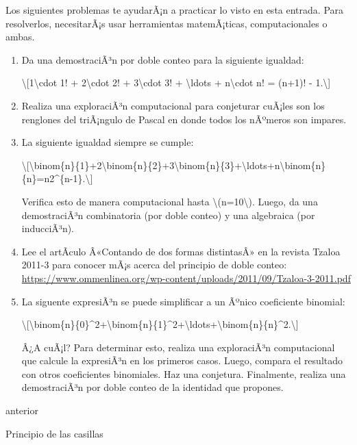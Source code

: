 \documentclass[
]{article}
\begin{document}
Los siguientes problemas te ayudarÃ¡n a practicar lo visto en esta
entrada. Para resolverlos, necesitarÃ¡s usar herramientas matemÃ¡ticas,
computacionales o ambas.

\begin{enumerate}
\item
  Da una demostraciÃ³n por doble conteo para la siguiente igualdad:

  \textbackslash{[}1\textbackslash cdot 1! + 2\textbackslash cdot 2! +
  3\textbackslash cdot 3! + \textbackslash ldots + n\textbackslash cdot
  n! = (n+1)! - 1.\textbackslash{]}
\item
  Realiza una exploraciÃ³n computacional para conjeturar cuÃ¡les son los
  renglones del triÃ¡ngulo de Pascal en donde todos los nÃºmeros son
  impares.
\item
  La siguiente igualdad siempre se cumple:

  \textbackslash{[}\textbackslash binom\{n\}\{1\}+2\textbackslash binom\{n\}\{2\}+3\textbackslash binom\{n\}\{3\}+\textbackslash ldots+n\textbackslash binom\{n\}\{n\}=n2\^{}\{n-1\}.\textbackslash{]}

  Verifica esto de manera computacional hasta
  {\textbackslash(n=10\textbackslash)}. Luego, da una demostraciÃ³n
  combinatoria (por doble conteo) y una algebraica (por inducciÃ³n).
\item
  Lee el artÃ­culo Â«Contando de dos formas distintasÂ» en la revista
  Tzaloa 2011-3 para conocer mÃ¡s acerca del principio de doble conteo:
  \url{https://www.ommenlinea.org/wp-content/uploads/2011/09/Tzaloa-3-2011.pdf}
\item
  La siguente expresiÃ³n se puede simplificar a un Ãºnico coeficiente
  binomial:

  \textbackslash{[}\textbackslash binom\{n\}\{0\}\^{}2+\textbackslash binom\{n\}\{1\}\^{}2+\textbackslash ldots+\textbackslash binom\{n\}\{n\}\^{}2.\textbackslash{]}

  Â¿A cuÃ¡l? Para determinar esto, realiza una exploraciÃ³n
  computacional que calcule la expresiÃ³n en los primeros casos. Luego,
  compara el resultado con otros coeficientes binomiales. Haz una
  conjetura. Finalmente, realiza una demostraciÃ³n por doble conteo de
  la identidad que propones.
\end{enumerate}

\href{Casillas.html}{\emph{}}

anterior

Principio de las casillas

\href{Induccion.html}{}
\end{document}
